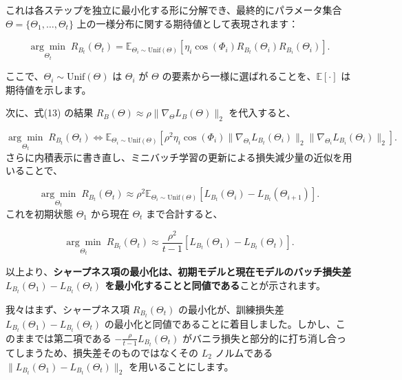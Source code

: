 \documentclass[11pt,a4paper]{article}
\begin{document}
これは各ステップを独立に最小化する形に分解でき、最終的にパラメータ集合 $\Theta = \{\Theta_1, \ldots, \Theta_t\}$ 上の一様分布に関する期待値として表現されます：

\begin{equation}
\underset{\Theta_t}{\arg\min} \; R_{B_t}(\Theta_t) = \mathbb{E}_{\Theta_i \sim \text{Unif}(\Theta)} \left[ \eta_i \cos(\Phi_i) R_{B_t}(\Theta_i) R_{B_i}(\Theta_i) \right].
\end{equation}

ここで、$\Theta_i \sim \text{Unif}(\Theta)$ は $\Theta_i$ が $\Theta$ の要素から一様に選ばれることを、$\mathbb{E}[\cdot]$ は期待値を示します。

次に、式(13) の結果 $R_B(\Theta) \approx \rho \|\nabla_\Theta L_B(\Theta)\|_2$ を代入すると、

\begin{equation}
\underset{\Theta_t}{\arg\min} \; R_{B_t}(\Theta_t) \Longleftrightarrow \mathbb{E}_{\Theta_i \sim \text{Unif}(\Theta)} \left[ \rho^2 \eta_i \cos(\Phi_i) \|\nabla_{\Theta_i} L_{B_t}(\Theta_i)\|_2 \|\nabla_{\Theta_i} L_{B_i}(\Theta_i)\|_2 \right].
\end{equation}
さらに内積表示に書き直し、ミニバッチ学習の更新による損失減少量の近似を用いることで、

\begin{equation}
\underset{\Theta_t}{\arg\min} \; R_{B_t}(\Theta_t) \approx \rho^2 \mathbb{E}_{\Theta_i \sim \text{Unif}(\Theta)} \left[ L_{B_t}(\Theta_i) - L_{B_t}(\Theta_{i+1}) \right].
\end{equation}
これを初期状態 $\Theta_1$ から現在 $\Theta_t$ まで合計すると、

\begin{equation}
\underset{\Theta_t}{\arg\min} \; R_{B_t}(\Theta_t) \approx \frac{\rho^2}{t-1} \left[ L_{B_t}(\Theta_1) - L_{B_t}(\Theta_t) \right].
\end{equation}

以上より、\textbf{シャープネス項の最小化は、初期モデルと現在モデルのバッチ損失差 $L_{B_t}(\Theta_1) - L_{B_t}(\Theta_t)$ を最小化することと同値である}ことが示されます。

我々はまず、シャープネス項 $R_{B_t}(\Theta_t)$ の最小化が、訓練損失差 $L_{B_t}(\Theta_1) - L_{B_t}(\Theta_t)$ の最小化と同値であることに着目しました。しかし、このままでは第二項である $-\frac{\rho}{t-1}L_{B_t}(\Theta_t)$ がバニラ損失と部分的に打ち消し合ってしまうため、損失差そのものではなくその $L_2$ ノルムである $\|L_{B_t}(\Theta_1) - L_{B_t}(\Theta_t)\|_2$ を用いることにします。
\end{document}
